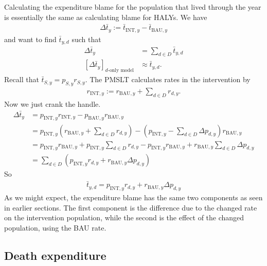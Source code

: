 \documentclass[]{article}
\begin{document}
Calculating the expenditure blame for the population that lived through the year is essentially the same as calculating blame for HALYs. We have
\begin{align*}
	\Delta\bar{t}_y := \bar{t}_{\text{INT}, y} - \bar{t}_{\text{BAU}, y}
\end{align*}
and want to find $\bar{t}_{y, d}$ such that
\begin{align*}
	\Delta \bar{t}_y &= \sum_{d \in D} \bar{t}_{y, d} \\
	[\Delta \bar{t}_y]_\text{$d$-only model} &\approx \bar{t}_{y, d}.
\end{align*}
Recall that $\bar{t}_{S, y} = p_{S, y} r_{S, y}$. The PMSLT calculates rates in the intervention by
\begin{align*}
	r_{\text{INT}, y} := r_{\text{BAU}, y} + \sum_{d \in D} r_{d, y}.
\end{align*}
Now we just crank the handle.
\begin{align*}
	\Delta \bar{t}_y &= p_{\text{INT}, y} r_{\text{INT}, y} - p_{\text{BAU}, y} r_{\text{BAU}, y} \\
	&= p_{\text{INT}, y}\left( r_{\text{BAU}, y} + \sum_{d \in D} r_{d, y}\right) - \left(p_{\text{INT}, y} - \sum_{d \in D} \Delta p_{d, y} \right) r_{\text{BAU}, y} \\
	&= p_{\text{INT}, y}r_{\text{BAU}, y} + p_{\text{INT}, y}\sum_{d \in D} r_{d, y} - p_{\text{INT}, y}r_{\text{BAU}, y} + r_{\text{BAU}, y}\sum_{d \in D} \Delta p_{d, y} \\
	&= \sum_{d \in D} \left(p_{\text{INT}, y}r_{d, y} + r_{\text{BAU}, y} \Delta p_{d, y}\right)
\end{align*}
So 
\begin{align*}
	\bar{t}_{y, d} = p_{\text{INT}, y}r_{d, y} + r_{\text{BAU}, y} \Delta p_{d, y}
\end{align*}
As we might expect, the expenditure blame has the same two components as seen in earlier sections. The first component is the difference due to the changed rate on the intervention population, while the second is the effect of the changed population, using the BAU rate.

\subsection{Death expenditure}
\end{document}
